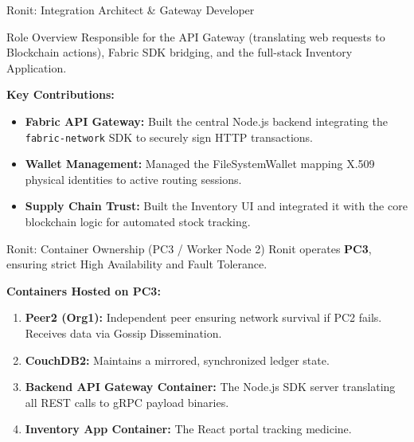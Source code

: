 \documentclass[10pt,aspectratio=169]{beamer}
\begin{document}
\begin{frame}{Ronit: Integration Architect \& Gateway Developer}
    \begin{block}{Role Overview}
        Responsible for the API Gateway (translating web requests to Blockchain actions), Fabric SDK bridging, and the full-stack Inventory Application.
    \end{block}
    \vspace{0.5cm}
    \textbf{Key Contributions:}
    \begin{itemize}
        \item \textbf{Fabric API Gateway:} Built the central Node.js backend integrating the \texttt{fabric-network} SDK to securely sign HTTP transactions.
        \item \textbf{Wallet Management:} Managed the FileSystemWallet mapping X.509 physical identities to active routing sessions.
        \item \textbf{Supply Chain Trust:} Built the Inventory UI and integrated it with the core blockchain logic for automated stock tracking.
    \end{itemize}
\end{frame}

\begin{frame}{Ronit: Container Ownership (PC3 / Worker Node 2)}
    Ronit operates \textbf{PC3}, ensuring strict High Availability and Fault Tolerance.
    \vspace{0.5cm}
    
    \textbf{Containers Hosted on PC3:}
    \begin{enumerate}
        \item \textbf{Peer2 (Org1):} Independent peer ensuring network survival if PC2 fails. Receives data via Gossip Dissemination.
        \item \textbf{CouchDB2:} Maintains a mirrored, synchronized ledger state.
        \item \textbf{Backend API Gateway Container:} The Node.js SDK server translating all REST calls to gRPC payload binaries.
        \item \textbf{Inventory App Container:} The React portal tracking medicine.
    \end{enumerate}
\end{frame}
\end{document}
